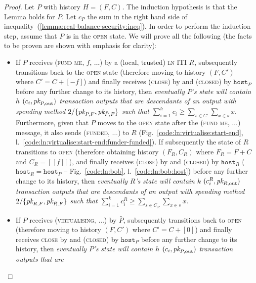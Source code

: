 \begin{proof}
  Let $P$ with history $H = (F, C)$. The induction hypothesis is that the Lemma
  holds for $P$. Let $c_P$ the sum in the right hand side of
  inequality~(\ref{lemma:real-balance-security:ineq}). In order to perform the
  induction step, assume that $P$ is in the \textsc{open} state. We will prove
  all the following (the facts to be proven are shown with emphasis for
  clarity):
  \begin{itemize}
    \item If $P$ receives (\textsc{fund me}, $f$, $\dots$) by a (local, trusted)
    \textsc{ln} ITI $R$, subsequently transitions back to the \textsc{open}
    state (therefore moving to history $(F, C')$ where $C' = C + [-f]$) and
    finally receives (\textsc{close}) by \environment and (\textsc{closed}) by
    $\texttt{host}_P$ before any further change to its history, then
    \emph{eventually $P$'s \ledger state will contain $h$ $(c_i, \textit{pk}_{P,
    \mathrm{out}})$ transaction outputs that are descendants of an output with
    spending method $2/\{\textit{pk}_{P, F}, \textit{pk}_{\bar{P}, F}\}$ such that
    $\sum\limits_{i=1}^h c_i \geq \sum\limits_{s \in C'} \sum\limits_{x \in s}
    x$}. Furthermore, given that $P$ moves to the \textsc{open} state after the
    (\textsc{fund me}, $\dots$) message, it also sends (\textsc{funded},
    $\dots$) to $R$ (Fig.~\ref{code:ln:virtualise:start-end},
    l.~\ref{code:ln:virtualise:start-end:funder-funded}). If subsequently the
    state of $R$ transitions to \textsc{open} (therefore obtaining history
    $(F_R, C_R)$ where $F_R = F + C$ and $C_R = [[f]]$), and finally receives
    (\textsc{close}) by \environment and (\textsc{closed}) by $\texttt{host}_R$
    ($\texttt{host}_R = \texttt{host}_P$ -- Fig.~\ref{code:ln:bob},
    l.~\ref{code:ln:bob:host}) before any further change to its history, then
    \emph{eventually $R$'s \ledger state will contain $k$ $(c^R_i, \textit{pk}_{R,
    \mathrm{out}})$ transaction outputs that are descendants of an output with
    spending method $2/\{\textit{pk}_{R, F}, \textit{pk}_{\bar{R}, F}\}$ such that
    $\sum\limits_{i=1}^k c^R_i \geq \sum\limits_{s \in C_R} \sum\limits_{x \in
    s} x$}.
    \item If $P$ receives (\textsc{virtualising}, $\dots$) by $\bar{P}$,
    subsequently transitions back to \textsc{open} (therefore moving to history
    $(F, C')$ where $C' = C + [0]$) and finally receives \textsc{close} by
    \environment and (\textsc{closed}) by $\texttt{host}_P$ before any further
    change to its history, then \emph{eventually $P$'s \ledger state will
    contain $h$ $(c_i, \textit{pk}_{P, \mathrm{out}})$ transaction outputs that are
}
\end{itemize}
\end{proof}
